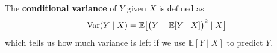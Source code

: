   \begin{definition}
    The \textbf{conditional variance} of $Y$ given $X$ is defined as 
    \begin{equation}
      \operatorname{Var}(Y \mid X) = \mathbb{E} \big[ \big( Y - \mathbb{E}[Y \mid X] \big)^2 \mid X \big]
    \end{equation}
    which tells us how much variance is left if we use $\mathbb{E}[Y \mid X]$ to predict $Y$. 
  \end{definition}


